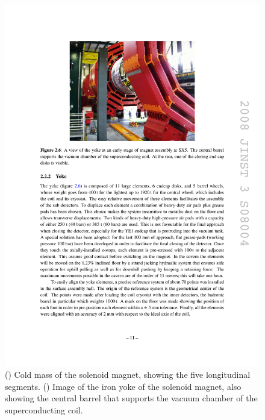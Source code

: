 \begin{figure}[hbtp]
\begin{center}
    \includegraphics[width=1.24\cmsFigWidth]{figures/cms-magnetyoke}
    \caption{(\cmsLeft) Cold mass of the solenoid magnet, showing the five longitudinal segments. (\cmsRight) Image of the iron yoke of the solenoid magnet, also showing the central barrel that supports the vacuum chamber of the superconducting coil.~\cite{1748-0221-3-08-S08004}}
    \label{fig:cms-magnet}
  \end{center}
\end{figure}

